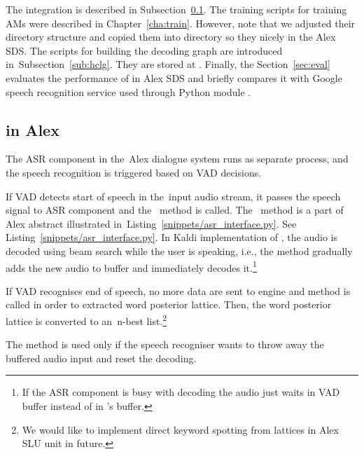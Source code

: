 The  integration is described in Subsection~\ref{sub:asr_component}.
The training scripts for training \acp{AM} were described in Chapter~\ref{cha:train}.
However, note that we adjusted their directory structure and copied them into  directory so they nicely in the Alex \ac{SDS}.
The scripts for building the  decoding graph are introduced in~Subsection~\ref{sub:hclg}.
They are stored at .
Finally, the Section~\ref{sec:eval} evaluates the performance of  in Alex \ac{SDS} and briefly compares it with Google speech recognition service used through Python module .

\subsection{ in Alex}
\label{sub:asr_component}
The \ac{ASR} component in the~Alex dialogue system runs as separate process, and the speech recognition is triggered based on \ac{VAD} decisions.

If \ac{VAD} detects start of speech in the~input audio stream, it passes the speech signal to \ac{ASR} component and the~ method is called. 
The~ method is a part of Alex abstract  illustrated in~Listing~\ref{snippets/asr_interface.py}.
See Listing~\ref{snippets/asr_interface.py}.
In Kaldi implementation of , the audio is decoded using beam search while the user is speaking, i.e., the method  gradually adds the new audio to  buffer and immediately decodes it.\footnote{If the \ac{ASR} component is busy with decoding the audio just waits in \ac{VAD} buffer instead of in 's buffer.}

If \ac{VAD} recognises end of speech, no more data are sent to  engine and  method is called in order to extracted word posterior lattice.
Then, the word posterior lattice is converted to an~n-best list.\footnote{We would like to implement direct keyword spotting from  lattices in Alex \ac{SLU} unit in future.}

The  method is used only if the speech recogniser wants to throw away the buffered audio input and reset the decoding.

